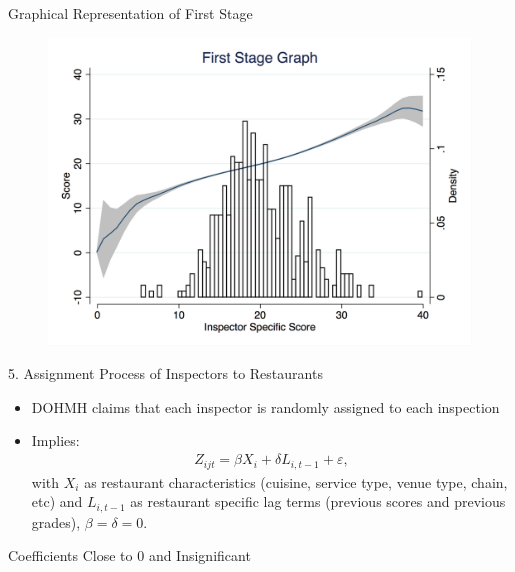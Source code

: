\documentclass[handout]{beamer}
\begin{document}
\begin{frame}{Graphical Representation of First Stage}
    \begin{figure}
        \centering
        \includegraphics[scale = 0.38]{../../Figures/first_stage_score.png}
    \end{figure}
\end{frame}

\begin{frame}{5. Assignment Process of Inspectors to Restaurants}
\begin{itemize}
\item DOHMH claims that each inspector is randomly assigned to each inspection
\item Implies: 
\begin{align*}
Z_{ijt} = \beta X_i + \delta L_{i,t-1} + \varepsilon,
\end{align*}
with $X_i$ as restaurant characteristics (cuisine, service type, venue type, chain, etc) and $L_{i,t-1}$ as restaurant specific lag terms (previous scores and previous grades), $\beta = \delta = 0$. 

\end{itemize}
\end{frame}

\begin{frame}{Coefficients Close to 0 and Insignificant}
\begin{table}
\scalebox{0.5}{
}
\end{table}
\end{frame}
\end{document}

